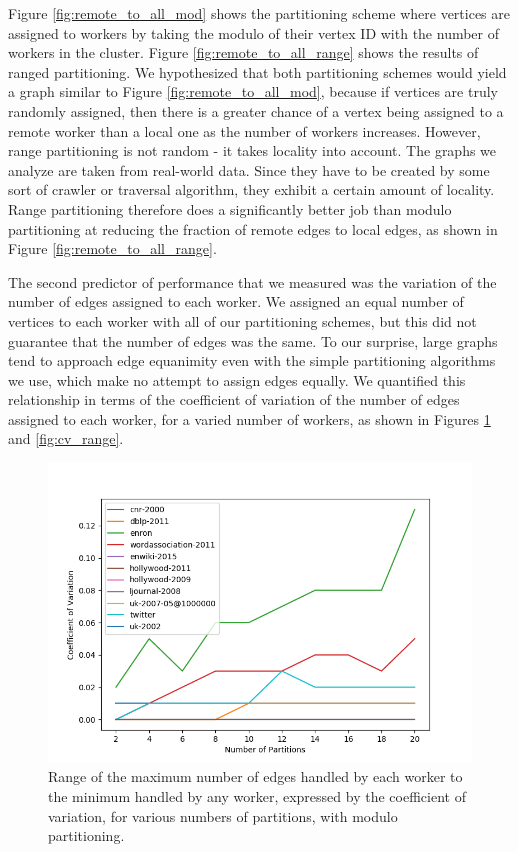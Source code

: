Figure \ref{fig:remote_to_all_mod} shows the partitioning scheme where vertices 
are assigned to workers by taking the modulo of their vertex ID with the number 
of workers in the cluster. Figure \ref{fig:remote_to_all_range} shows the 
results of ranged partitioning. We hypothesized that both partitioning schemes 
would yield a graph similar to Figure \ref{fig:remote_to_all_mod}, because if 
vertices are truly randomly assigned, then there is a greater chance of a 
vertex being assigned to a remote worker than a local one as the number of 
workers increases. However, range partitioning is not random - it takes 
locality into account. The graphs we analyze are taken from real-world 
data. Since they have to 
be created by some sort of crawler or traversal algorithm, they exhibit a 
certain amount of locality. Range partitioning therefore
does a significantly better job than modulo partitioning at reducing the 
fraction of remote edges to local edges, as shown in Figure 
\ref{fig:remote_to_all_range}.

The second predictor of performance that we measured was the variation of the 
number of edges assigned to each worker. We assigned an equal number of 
vertices to each worker with all of our partitioning schemes, but this did not 
guarantee that the number of edges was the same. To our surprise, large graphs 
tend to approach edge equanimity even with the simple partitioning algorithms 
we use, which make no attempt to assign edges equally. We quantified this 
relationship in terms of the coefficient of variation of the number of edges 
assigned to each worker, for a varied number of workers, as shown in Figures 
\ref{fig:cv_mod} and \ref{fig:cv_range}.

\begin{figure}[!t]
	\centering
	\includegraphics[width=\columnwidth]{../good_plots/range_as_cv_modulo.png}
	\caption{Range of the maximum number of edges handled by each worker to the 
		minimum handled by any worker, expressed by the coefficient of 
		variation, 
		for various numbers of partitions, with modulo partitioning.}
	\label{fig:cv_mod}
\end{figure}

